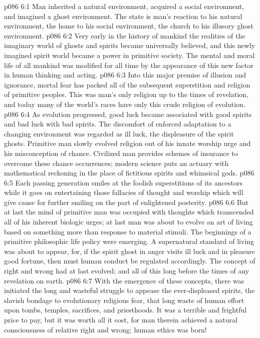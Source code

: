 \vs p086 6:1 Man inherited a natural environment, acquired a social environment, and imagined a ghost environment. The state is man’s reaction to his natural environment, the home to his social environment, the church to his illusory ghost environment.
\vs p086 6:2 Very early in the history of mankind the realities of the imaginary world of ghosts and spirits became universally believed, and this newly imagined spirit world became a power in primitive society. The mental and moral life of all mankind was modified for all time by the appearance of this new factor in human thinking and acting.
\vs p086 6:3 Into this major premise of illusion and ignorance, mortal fear has packed all of the subsequent superstition and religion of primitive peoples. This was man’s only religion up to the times of revelation, and today many of the world’s races have only this crude religion of evolution.
\vs p086 6:4 As evolution progressed, good luck became associated with good spirits and bad luck with bad spirits. The discomfort of enforced adaptation to a changing environment was regarded as ill luck, the displeasure of the spirit ghosts. Primitive man slowly evolved religion out of his innate worship urge and his misconception of chance. Civilized man provides schemes of insurance to overcome these chance occurrences; modern science puts an actuary with mathematical reckoning in the place of fictitious spirits and whimsical gods.
\vs p086 6:5 Each passing generation smiles at the foolish superstitions of its ancestors while it goes on entertaining those fallacies of thought and worship which will give cause for further smiling on the part of enlightened posterity.
\vs p086 6:6 \pc But at last the mind of primitive man was occupied with thoughts which transcended all of his inherent biologic urges; at last man was about to evolve an art of living based on something more than response to material stimuli. The beginnings of a primitive philosophic life policy were emerging. A supernatural standard of living was about to appear, for, if the spirit ghost in anger visits ill luck and in pleasure good fortune, then must human conduct be regulated accordingly. The concept of right and wrong had at last evolved; and all of this long before the times of any revelation on earth.
\vs p086 6:7 With the emergence of these concepts, there was initiated the long and wasteful struggle to appease the ever\hyp{}displeased spirits, the slavish bondage to evolutionary religious fear, that long waste of human effort upon tombs, temples, sacrifices, and priesthoods. It was a terrible and frightful price to pay, but it was worth all it cost, for man therein achieved a natural consciousness of relative right and wrong; human ethics was born!

